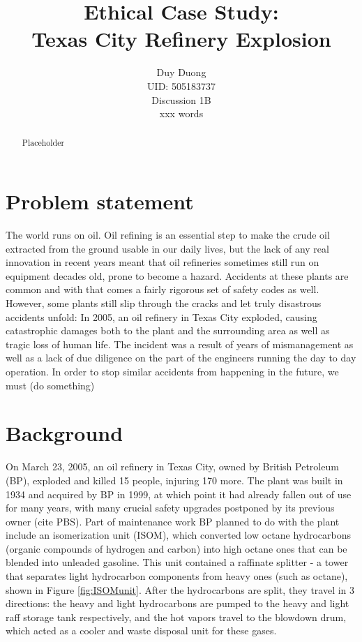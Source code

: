 \documentclass[12pt]{article}
\begin{document}
		\title{Ethical Case Study: \\Texas City Refinery Explosion}

	\author{Duy Duong\\UID: 505183737\\Discussion 1B\\xxx words}
	\maketitle
	
	\begin{abstract}
Placeholder
	\end{abstract}
	\setlength{\parskip}{1em}
	\section*{Problem statement}
	The world runs on oil. Oil refining is an essential step to make the crude oil extracted from the ground usable in our daily lives, but the lack of any real innovation in recent years meant that oil refineries sometimes still run on equipment decades old, prone to become a hazard. Accidents at these plants are common and with that comes a fairly rigorous set of safety codes as well. However, some plants still slip through the cracks and let truly disastrous accidents unfold: In 2005, an oil refinery in Texas City exploded, causing catastrophic damages both to the plant and the surrounding area as well as tragic loss of human life. The incident was a result of years of mismanagement as well as a lack of due diligence on the part of the engineers running the day to day operation. In order to stop similar accidents from happening in the future, we must (do something)
	\section*{Background}
	
	On March 23, 2005, an oil refinery in Texas City, owned by British Petroleum (BP), exploded and killed 15 people, injuring 170 more. The plant was built in 1934 and acquired by BP in 1999, at which point it had already fallen out of use for many years, with many crucial safety upgrades postponed by its previous owner (cite PBS). Part of maintenance work BP planned to do with the plant include an isomerization unit (ISOM), which converted low octane hydrocarbons (organic compounds of hydrogen and carbon) into high octane ones that can be blended into unleaded gasoline. This unit contained a raffinate splitter - a tower that separates light hydrocarbon components from heavy ones (such as octane), shown in Figure \ref{fig:ISOMunit}. After the hydrocarbons are split, they travel in 3 directions: the heavy and light hydrocarbons are pumped to the heavy and light raff storage tank respectively, and the hot vapors travel to the blowdown drum, which acted as a cooler and waste disposal unit for these gases.
	
\end{document}
